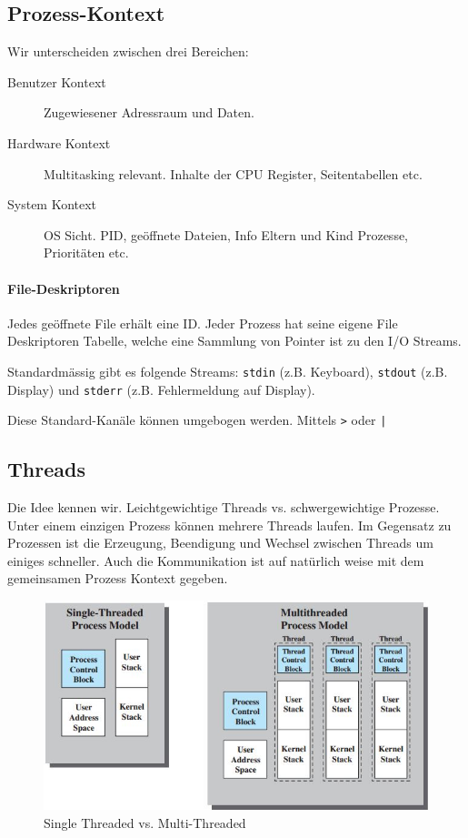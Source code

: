 \subsection{Prozess-Kontext}
Wir unterscheiden zwischen drei Bereichen:
\begin{description}
	\item[Benutzer Kontext] Zugewiesener Adressraum und Daten.
	\item[Hardware Kontext] Multitasking relevant. Inhalte der CPU Register, Seitentabellen etc.
	\item[System Kontext] OS Sicht. PID, geöffnete Dateien, Info Eltern und Kind Prozesse, Prioritäten etc. 
\end{description}

\paragraph{File-Deskriptoren}
Jedes geöffnete File erhält eine ID. Jeder Prozess hat seine eigene File Deskriptoren Tabelle, welche eine Sammlung von Pointer ist zu den I/O Streams.

Standardmässig gibt es folgende Streams: \texttt{stdin} (z.B. Keyboard), \texttt{stdout} (z.B. Display) und \texttt{stderr} (z.B. Fehlermeldung auf Display).

Diese Standard-Kanäle können umgebogen werden. Mittels \texttt{>} oder \texttt{|}

\subsection{Threads}
Die Idee kennen wir. Leichtgewichtige Threads vs. schwergewichtige Prozesse. Unter einem einzigen Prozess können mehrere Threads laufen. Im Gegensatz zu Prozessen ist die Erzeugung, Beendigung und Wechsel zwischen Threads um einiges schneller. Auch die Kommunikation ist auf natürlich weise mit dem gemeinsamen Prozess Kontext gegeben.

\begin{figure}[h!]
	\centering
	\includegraphics[width=0.7\linewidth]{fig/system-software-single-threaded-vs-muli-threaded}
	\caption{Single Threaded vs. Multi-Threaded}
	\label{fig:system-software-single-threaded-vs-muli-threaded}
\end{figure}

